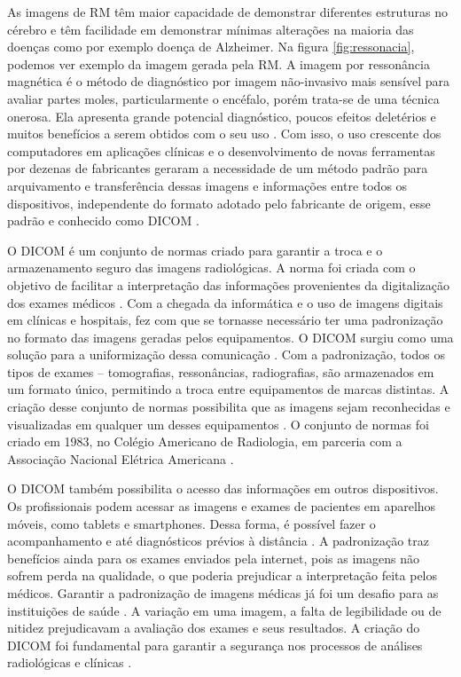 \documentclass[openright]{UFRGS} %
\begin{document}
As imagens de RM têm maior capacidade de demonstrar diferentes estruturas no cérebro e têm facilidade em demonstrar mínimas alterações na maioria das doenças como por exemplo doença de Alzheimer. Na figura \ref{fig:ressonacia}, podemos ver exemplo da imagem gerada pela RM. A imagem por ressonância magnética é o método de diagnóstico por imagem não-invasivo mais sensível para avaliar partes moles, particularmente o encéfalo, porém trata-se de uma técnica onerosa. Ela apresenta grande potencial diagnóstico, poucos efeitos deletérios e muitos benefícios a serem obtidos com o seu uso \cite{mazzola2009ressonancia}. Com isso, o uso crescente dos computadores em aplicações clínicas e o desenvolvimento de novas ferramentas por dezenas de fabricantes geraram a necessidade de um método padrão para arquivamento e transferência dessas imagens e informações entre todos os dispositivos, independente do formato adotado pelo fabricante de origem, esse padrão e conhecido como DICOM \cite{grauer2009working}.


O DICOM é um conjunto de normas criado para garantir a troca e o armazenamento seguro das imagens radiológicas. A norma foi criada com o objetivo de facilitar a interpretação das informações provenientes da digitalização dos exames médicos \cite{graham2005dicom}. Com a chegada da informática e o uso de imagens digitais em clínicas e hospitais, fez com que se tornasse necessário ter uma padronização no formato das imagens geradas pelos equipamentos. O DICOM surgiu como uma solução para a uniformização dessa comunicação \cite{mustra2008overview}. Com a padronização, todos os tipos de exames – tomografias, ressonâncias, radiografias, são armazenados em um formato único, permitindo a troca entre equipamentos de marcas distintas. A criação desse conjunto de normas possibilita que as imagens sejam reconhecidas e visualizadas em qualquer um desses equipamentos \cite{graham2005dicom}. O conjunto de normas foi criado em 1983, no Colégio Americano de Radiologia, em parceria com a Associação Nacional Elétrica Americana \cite{varma2012managing}.

O DICOM também possibilita o acesso das informações em outros dispositivos. Os profissionais podem acessar as imagens e exames de pacientes em aparelhos móveis, como tablets e smartphones. Dessa forma, é possível fazer o acompanhamento e até diagnósticos prévios à distância \cite{noumeir2006benefits}. A padronização traz benefícios ainda para os exames enviados pela internet, pois as imagens não sofrem perda na qualidade, o que poderia prejudicar a interpretação feita pelos médicos. Garantir a padronização de imagens médicas já foi um desafio para as instituições de saúde \cite{noumeir2006benefits}. A variação em uma imagem, a falta de legibilidade ou de nitidez prejudicavam a avaliação dos exames e seus resultados. A criação do DICOM foi fundamental para garantir a segurança nos processos de análises radiológicas e clínicas \cite{liu2007medical}.
\end{document}

